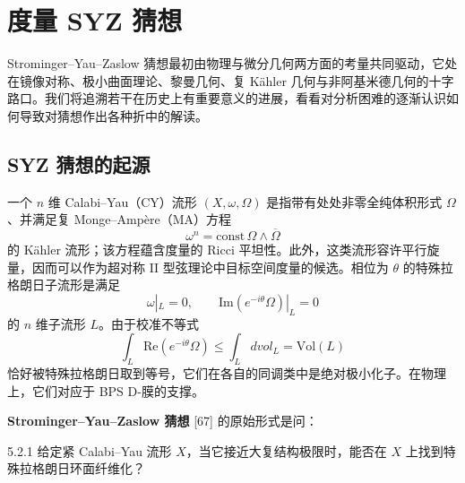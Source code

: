 \section{度量 SYZ 猜想}

Strominger--Yau--Zaslow 猜想最初由物理与微分几何两方面的考量共同驱动，它处在镜像对称、极小曲面理论、黎曼几何、复 Kähler 几何与非阿基米德几何的十字路口。我们将追溯若干在历史上有重要意义的进展，看看对分析困难的逐渐认识如何导致对猜想作出各种折中的解读。

\subsection{SYZ 猜想的起源}

一个 $n$ 维 Calabi--Yau（CY）流形 $(X,\omega,\Omega)$ 是指带有处处非零全纯体积形式 $\Omega$、并满足复 Monge--Ampère（MA）方程
\begin{equation}
\omega^n = \mathrm{const}\,\Omega\wedge\overline{\Omega} \tag{5.1}
\end{equation}
的 Kähler 流形；该方程蕴含度量的 Ricci 平坦性。此外，这类流形容许平行旋量，因而可以作为超对称 II 型弦理论中目标空间度量的候选。相位为 $\theta$ 的特殊拉格朗日子流形是满足
\begin{equation}
\omega|_L = 0,\qquad \mathrm{Im}(e^{-i\theta}\Omega)|_L = 0 \tag{5.2}
\end{equation}
的 $n$ 维子流形 $L$。由于校准不等式
\begin{equation}
\int_L \mathrm{Re}(e^{-i\theta}\Omega) \le \int_L dvol_L = \mathrm{Vol}(L) \tag{5.3}
\end{equation}
恰好被特殊拉格朗日取到等号，它们在各自的同调类中是绝对极小化子。在物理上，它们对应于 BPS D-膜的支撑。



\textbf{Strominger--Yau--Zaslow 猜想} [67] 的原始形式是问：

\begin{conjecture}{5.2.1}
给定紧 Calabi--Yau 流形 $X$，当它接近大复结构极限时，能否在 $X$ 上找到特殊拉格朗日环面纤维化？
\end{conjecture}

